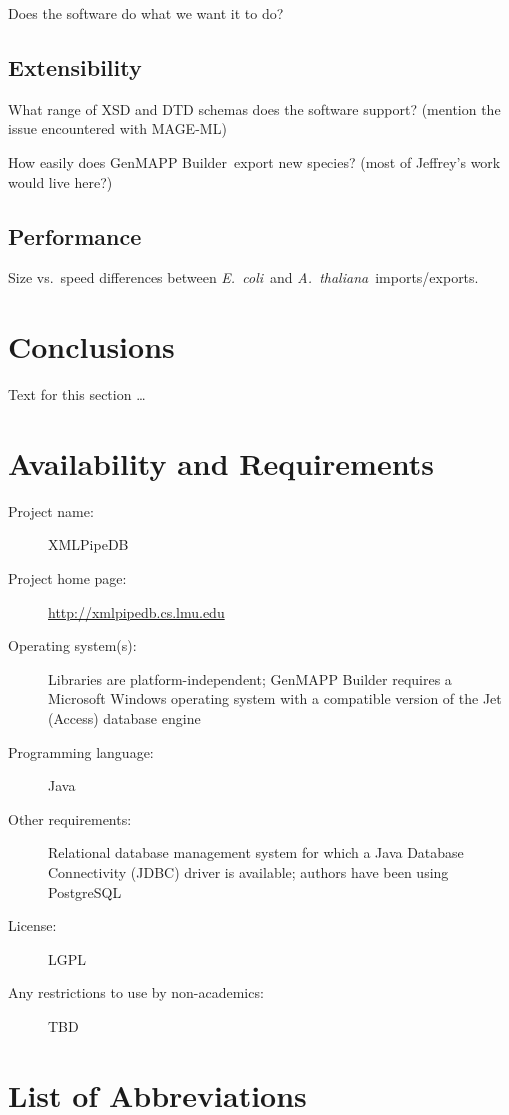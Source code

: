 \documentclass[10pt]{bmc_article}
\newenvironment{bmcformat}{\begin{raggedright}\baselineskip20pt\sloppy\setboolean{publ}{false}}{\end{raggedright}\baselineskip20pt\sloppy}
\def\gmb{GenMAPP Builder}
\def\ecoli{\emph{E.\ coli}}
\def\athaliana{\emph{A.\ thaliana}}
\begin{document}
\begin{bmcformat}
Does the software do what we want it to do?\pb

\subsection*{Extensibility}

What range of XSD and DTD schemas does the software support?  (mention the issue encountered with MAGE-ML)\pb

How easily does \gmb\ export new species?  (most of Jeffrey's work would live here?)\pb

\subsection*{Performance}

Size vs.\ speed differences between \ecoli\ and \athaliana\ imports/exports.\pb
    

\section*{Conclusions}
  Text for this section \ldots



\section*{Availability and Requirements}

\begin{description}
\item[Project name:] XMLPipeDB
\item[Project home page:] \url{http://xmlpipedb.cs.lmu.edu}
\item[Operating system(s):] Libraries are platform-independent; GenMAPP Builder requires a Microsoft Windows operating system with a compatible version of the Jet (Access) database engine
\item[Programming language:] Java
\item[Other requirements:] Relational database management system for which a Java Database Connectivity (JDBC) driver is available; authors have been using PostgreSQL
\item[License:] LGPL
\item[Any restrictions to use by non-academics:] TBD
\end{description}


\section*{List of Abbreviations}


\end{bmcformat}
\end{document}
